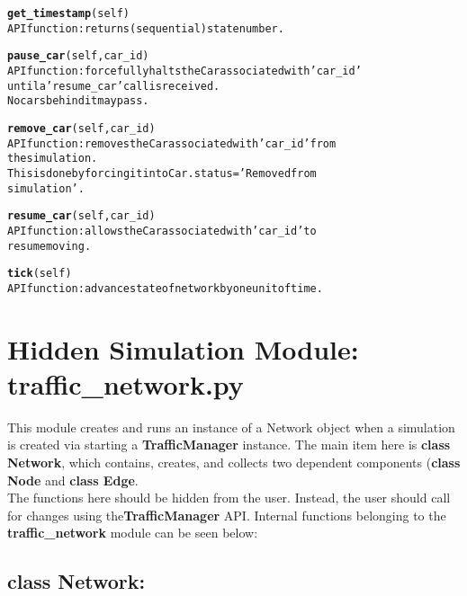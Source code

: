 \begin{alltt}
\textbf{get_timestamp}(self)
API function:  returns (sequential) state number.

\textbf{pause_car}(self, car_id)
API function:  forcefully halts the Car associated with 'car_id' 
until a 'resume_car' call is received.
No cars behind it may pass.

\textbf{remove_car}(self, car_id)
API function:  removes the Car associated with 'car_id' from
the simulation.
This is done by forcing it into Car.status = 'Removed from 
simulation'.

\textbf{resume_car}(self, car_id)
API function:  allows the Car associated with 'car_id' to 
resume moving.

\textbf{tick}(self)
API function:  advance state of network by one unit of time.


\end{alltt}

\section{Hidden Simulation Module: traffic\_network.py}

This module creates and runs an instance of a Network object when a simulation is created via starting a \textbf{TrafficManager} instance.  The main item here is \textbf{class Network}, which  contains, creates, and collects two dependent components (\textbf{class Node} and \textbf{class Edge}.  \\

\noindent The functions here should be hidden from the user.  Instead, the user should call for changes using the\textbf{TrafficManager} API.  Internal functions belonging to the \textbf{traffic\_network} module can be seen below:

\subsection{class Network:}

